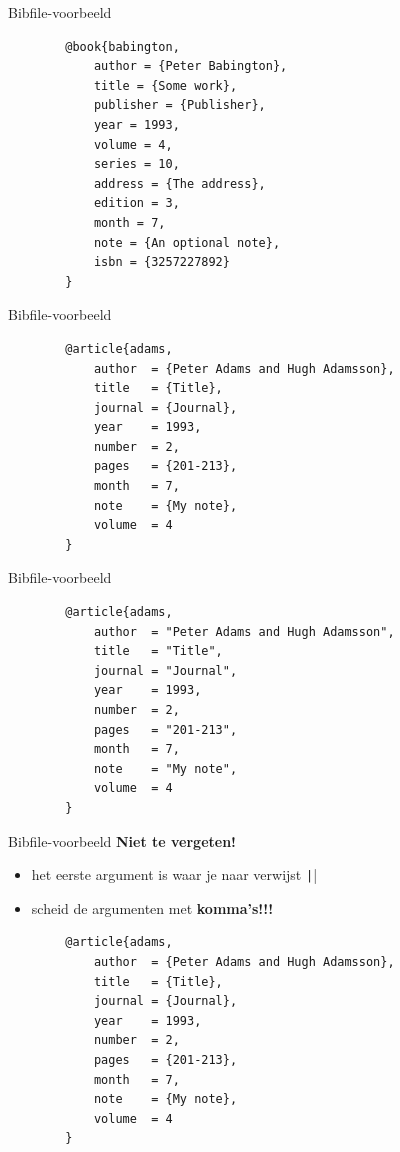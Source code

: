 \begin{frame}[fragile]{Bibfile-voorbeeld}
	\begin{verbatim}
		@book{babington,
			author = {Peter Babington},
			title = {Some work},
			publisher = {Publisher},
			year = 1993,
			volume = 4,
			series = 10,
			address = {The address},
			edition = 3,
			month = 7,
			note = {An optional note},
			isbn = {3257227892}
		}
	\end{verbatim}
\end{frame}

\begin{frame}[fragile]{Bibfile-voorbeeld}
	\begin{verbatim}
		@article{adams,
			author  = {Peter Adams and Hugh Adamsson},
			title   = {Title},
			journal = {Journal},
			year    = 1993,
			number  = 2,
			pages   = {201-213},
			month   = 7,
			note    = {My note}, 
			volume  = 4
		}
	\end{verbatim}
\end{frame}


\begin{frame}[fragile]{Bibfile-voorbeeld}
	\begin{verbatim}
		@article{adams,
			author  = "Peter Adams and Hugh Adamsson",
			title   = "Title",
			journal = "Journal",
			year    = 1993,
			number  = 2,
			pages   = "201-213",
			month   = 7,
			note    = "My note", 
			volume  = 4
		}
	\end{verbatim}
\end{frame}


\begin{frame}[fragile]{Bibfile-voorbeeld}
	\textbf{Niet te vergeten!}
	\begin{itemize}[label=\textbullet]
		\item het eerste argument is waar je naar verwijst \texttt|\cite{adams}|\pause
		\item scheid de argumenten met \textbf{komma's!!!}
	\end{itemize}
	\begin{verbatim}
		@article{adams,
			author  = {Peter Adams and Hugh Adamsson},
			title   = {Title},
			journal = {Journal},
			year    = 1993,
			number  = 2,
			pages   = {201-213},
			month   = 7,
			note    = {My note}, 
			volume  = 4
		}
	\end{verbatim}
\end{frame}



